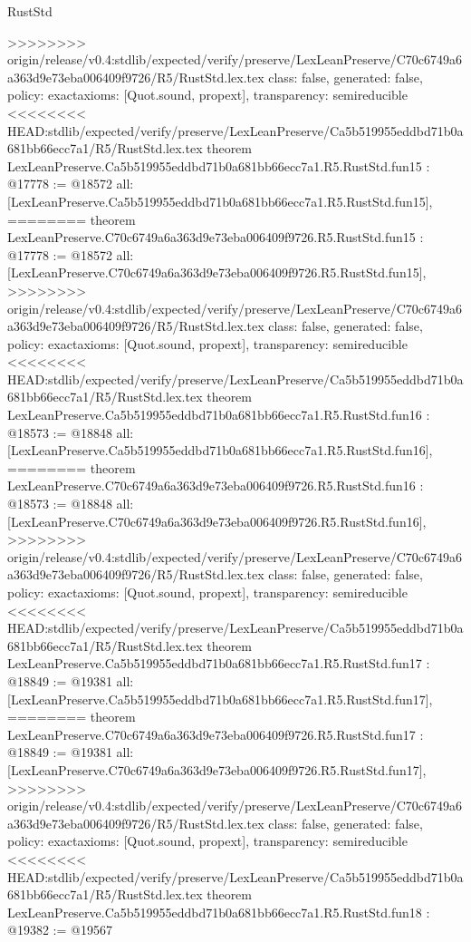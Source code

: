 \begin{lexlean}{RustStd}
\begin{coremodule}
{\begin{coremodule}
{{{{{{{{{{{{{{{{{{>>>>>>>> origin/release/v0.4:stdlib/expected/verify/preserve/LexLeanPreserve/C70c6749a6a363d9e73eba006409f9726/R5/RustStd.lex.tex
  class: false,
  generated: false,
  policy: exact{axioms: [Quot.sound, propext]},
  transparency: semireducible
}
<<<<<<<< HEAD:stdlib/expected/verify/preserve/LexLeanPreserve/Ca5b519955eddbd71b0a681bb66ecc7a1/R5/RustStd.lex.tex
theorem LexLeanPreserve.Ca5b519955eddbd71b0a681bb66ecc7a1.R5.RustStd.fun15 : @17778 := @18572 {
  all: [LexLeanPreserve.Ca5b519955eddbd71b0a681bb66ecc7a1.R5.RustStd.fun15],
========
theorem LexLeanPreserve.C70c6749a6a363d9e73eba006409f9726.R5.RustStd.fun15 : @17778 := @18572 {
  all: [LexLeanPreserve.C70c6749a6a363d9e73eba006409f9726.R5.RustStd.fun15],
>>>>>>>> origin/release/v0.4:stdlib/expected/verify/preserve/LexLeanPreserve/C70c6749a6a363d9e73eba006409f9726/R5/RustStd.lex.tex
  class: false,
  generated: false,
  policy: exact{axioms: [Quot.sound, propext]},
  transparency: semireducible
}
<<<<<<<< HEAD:stdlib/expected/verify/preserve/LexLeanPreserve/Ca5b519955eddbd71b0a681bb66ecc7a1/R5/RustStd.lex.tex
theorem LexLeanPreserve.Ca5b519955eddbd71b0a681bb66ecc7a1.R5.RustStd.fun16 : @18573 := @18848 {
  all: [LexLeanPreserve.Ca5b519955eddbd71b0a681bb66ecc7a1.R5.RustStd.fun16],
========
theorem LexLeanPreserve.C70c6749a6a363d9e73eba006409f9726.R5.RustStd.fun16 : @18573 := @18848 {
  all: [LexLeanPreserve.C70c6749a6a363d9e73eba006409f9726.R5.RustStd.fun16],
>>>>>>>> origin/release/v0.4:stdlib/expected/verify/preserve/LexLeanPreserve/C70c6749a6a363d9e73eba006409f9726/R5/RustStd.lex.tex
  class: false,
  generated: false,
  policy: exact{axioms: [Quot.sound, propext]},
  transparency: semireducible
}
<<<<<<<< HEAD:stdlib/expected/verify/preserve/LexLeanPreserve/Ca5b519955eddbd71b0a681bb66ecc7a1/R5/RustStd.lex.tex
theorem LexLeanPreserve.Ca5b519955eddbd71b0a681bb66ecc7a1.R5.RustStd.fun17 : @18849 := @19381 {
  all: [LexLeanPreserve.Ca5b519955eddbd71b0a681bb66ecc7a1.R5.RustStd.fun17],
========
theorem LexLeanPreserve.C70c6749a6a363d9e73eba006409f9726.R5.RustStd.fun17 : @18849 := @19381 {
  all: [LexLeanPreserve.C70c6749a6a363d9e73eba006409f9726.R5.RustStd.fun17],
>>>>>>>> origin/release/v0.4:stdlib/expected/verify/preserve/LexLeanPreserve/C70c6749a6a363d9e73eba006409f9726/R5/RustStd.lex.tex
  class: false,
  generated: false,
  policy: exact{axioms: [Quot.sound, propext]},
  transparency: semireducible
}
<<<<<<<< HEAD:stdlib/expected/verify/preserve/LexLeanPreserve/Ca5b519955eddbd71b0a681bb66ecc7a1/R5/RustStd.lex.tex
theorem LexLeanPreserve.Ca5b519955eddbd71b0a681bb66ecc7a1.R5.RustStd.fun18 : @19382 := @19567 {
}}}}}}}}}}}}}}}}}}}}}
\end{coremodule}}
\end{coremodule}
\end{lexlean}
